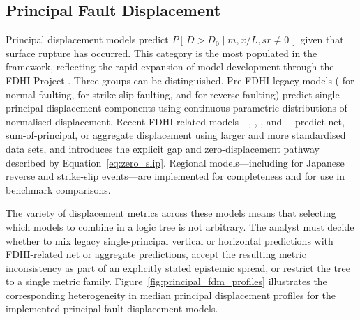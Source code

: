 \subsection{Principal Fault Displacement}
\label{sec:model_library:principal_fd}

Principal displacement models predict $P[\,D > D_0 \mid m, x/L, sr \neq 0\,]$ given that surface rupture has occurred. This category is the most populated in the framework, reflecting the rapid expansion of model development through the FDHI Project \citep{Bozorgnia2021, Sarmiento2025}. Three groups can be distinguished. Pre-FDHI legacy models (\citealt{youngs_methodology_2003} for normal faulting, \citealt{Petersen2011} for strike-slip faulting, and \citealt{MossRoss2011} for reverse faulting) predict single-principal displacement components using continuous parametric distributions of normalised displacement. Recent FDHI-related models---\citet{LavrentiadisAbrahamson2023}, \citet{Kuehn2024}, \citet{Chiou2025}, and \citet{Moss2024}---predict net, sum-of-principal, or aggregate displacement using larger and more standardised data sets, and \citet{LavrentiadisAbrahamson2023} introduces the explicit gap and zero-displacement pathway described by Equation~\eqref{eq:zero_slip}. Regional models---including \citet{Takao2013} for Japanese reverse and strike-slip events---are implemented for completeness and for use in benchmark comparisons.

The variety of displacement metrics across these models means that selecting which models to combine in a logic tree is not arbitrary. The analyst must decide whether to mix legacy single-principal vertical or horizontal predictions with FDHI-related net or aggregate predictions, accept the resulting metric inconsistency as part of an explicitly stated epistemic spread, or restrict the tree to a single metric family. Figure~\ref{fig:principal_fdm_profiles} illustrates the corresponding heterogeneity in median principal displacement profiles for the implemented principal fault-displacement models.


